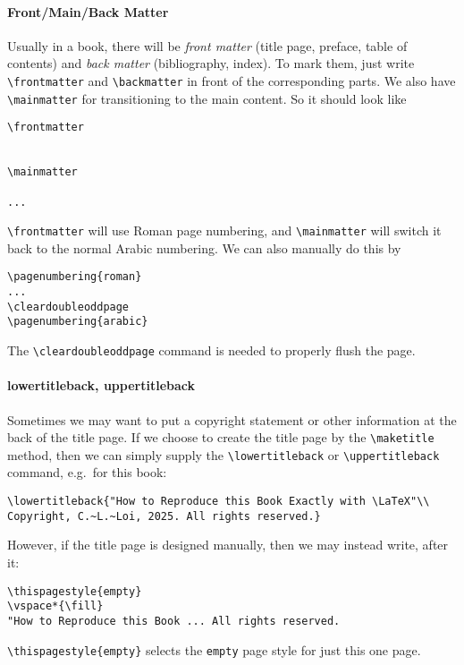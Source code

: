 \paragraph{Front/Main/Back Matter} Usually in a book, there will be \textit{front matter} (title page, preface, table of contents) and \textit{back matter} (bibliography, index). To mark them, just write \texttt{\textbackslash frontmatter} and \texttt{\textbackslash backmatter} in front of the corresponding parts. We also have \texttt{\textbackslash mainmatter} for transitioning to the main content. So it should look like
\begin{lstlisting}
\frontmatter


\mainmatter

...
\end{lstlisting}
\texttt{\textbackslash frontmatter} will use Roman page numbering, and \texttt{\textbackslash mainmatter} will switch it back to the normal Arabic numbering. We can also manually do this by
\begin{lstlisting}
\pagenumbering{roman}
...
\cleardoubleoddpage
\pagenumbering{arabic}
\end{lstlisting}
The \texttt{\textbackslash cleardoubleoddpage} command is needed to properly flush the page.

\paragraph{lowertitleback, uppertitleback} Sometimes we may want to put a copyright statement or other information at the back of the title page. If we choose to create the title page by the \texttt{\textbackslash maketitle} method, then we can simply supply the \texttt{\textbackslash lowertitleback} or \texttt{\textbackslash uppertitleback} command, e.g.\ for this book:
\begin{lstlisting}
\lowertitleback{"How to Reproduce this Book Exactly with \LaTeX"\\
Copyright, C.~L.~Loi, 2025. All rights reserved.}    
\end{lstlisting}
However, if the title page is designed manually, then we may instead write, after it:
\begin{lstlisting}
\thispagestyle{empty}
\vspace*{\fill}
"How to Reproduce this Book ... All rights reserved.
\end{lstlisting}
\texttt{\textbackslash thispagestyle\{empty\}} selects the \texttt{empty} page style for just this one page.

